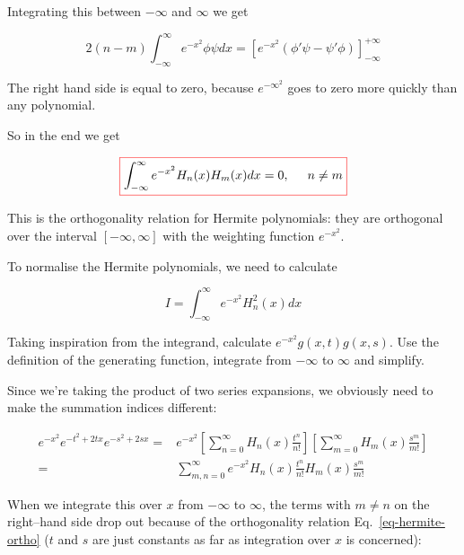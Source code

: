 Integrating this between $-\infty$ and $\infty$ we get

\begin{equation}
2(n-m)\int_{-\infty}^{\infty}e^{-x^2}\phi\psi dx = \left[e^{-x^2}\left(\phi'\psi -\psi'\phi\right)\right]_{-\infty}^{+\infty}
\end{equation} 

The right hand side is equal to zero, because $e^{-{\infty}^2}$ goes to zero more quickly than any polynomial.

So in the end we get

\begin{equation}
\fbox{$\displaystyle
\int_{-\infty}^{\infty}e^{-x^2}H_n(x)H_m(x)dx = 0, \hspace{0.5cm} n \ne m \label{eq-hermite-ortho}
$}
\end{equation} 

This is the orthogonality relation for Hermite polynomials: they are orthogonal over the interval $[-\infty, \infty]$ with the weighting function $e^{-x^2}$.


To normalise the Hermite polynomials, we need to calculate

\begin{equation}
I = \int_{-\infty}^{\infty}e^{-x^2}H_n^2(x)dx
\end{equation}

\begin{cue}
Taking inspiration from the integrand, calculate $e^{-x^2}g(x,t)g(x,s)$. Use the definition of the generating function, integrate from $-\infty$ to $\infty$ and simplify. 
\end{cue}

Since we're taking the product of two series expansions, we obviously need to make the summation indices different:

\begin{align}
e^{-x^2} e^{-t^2 + 2tx} e^{-s^2 + 2sx} =& e^{-x^2} \left[\sum_{n = 0}^{\infty} H_n(x)\frac{t^n}{n!}\right]\left[\sum_{m = 0}^{\infty} H_m(x)\frac{s^m}{m!}\right] \nonumber \\
 =& \sum_{m, n = 0}^{\infty}e^{-x^2} H_n(x)\frac{t^n}{n!}H_m(x)\frac{s^m}{m!}
\end{align} 

When we integrate this over $x$ from $-\infty$ to $\infty$, the terms with $m \ne n$ on the right--hand side drop out because of the orthogonality relation Eq.~\ref{eq-hermite-ortho} ($t$ and $s$ are just constants as far as integration over $x$ is concerned):

